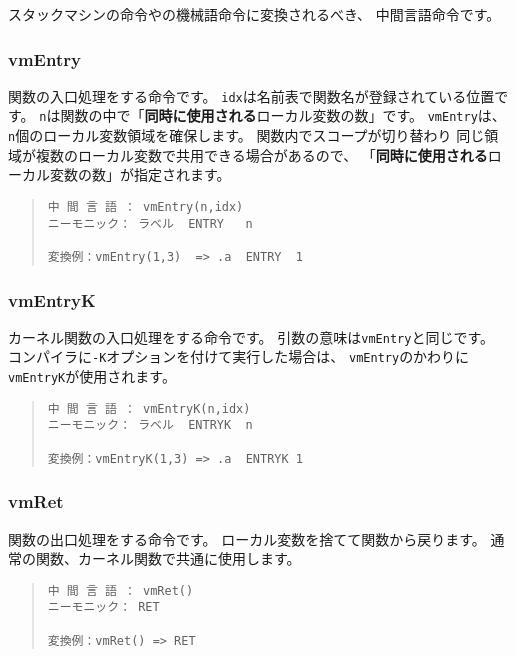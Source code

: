 スタックマシンの命令や\tac の機械語命令に変換されるべき、
中間言語命令です。

\subsubsection{vmEntry}

関数の入口処理をする命令です。
\verb/idx/は名前表で関数名が登録されている位置です。
\verb/n/は関数の中で「{\bf 同時に使用される}ローカル変数の数」です。
\verb/vmEntry/は、\verb/n/個のローカル変数領域を確保します。
関数内でスコープが切り替わり
同じ領域が複数のローカル変数で共用できる場合があるので、
「{\bf 同時に使用される}ローカル変数の数」が指定されます。

\begin{quote}
\begin{verbatim}
中 間 言 語 ： vmEntry(n,idx)
ニーモニック： ラベル  ENTRY   n

変換例：vmEntry(1,3)  => .a  ENTRY  1
\end{verbatim}
\end{quote}

\subsubsection{vmEntryK}

カーネル関数の入口処理をする命令です。
引数の意味は\verb/vmEntry/と同じです。
\cmm コンパイラに\verb/-K/オプションを付けて実行した場合は、
\verb/vmEntry/のかわりに\verb/vmEntryK/が使用されます。

\begin{quote}
\begin{verbatim}
中 間 言 語 ： vmEntryK(n,idx)
ニーモニック： ラベル  ENTRYK  n

変換例：vmEntryK(1,3) => .a  ENTRYK 1
\end{verbatim}
\end{quote}

\subsubsection{vmRet}

関数の出口処理をする命令です。
ローカル変数を捨てて関数から戻ります。
通常の関数、カーネル関数で共通に使用します。

\begin{quote}
\begin{verbatim}
中 間 言 語 ： vmRet()
ニーモニック： RET

変換例：vmRet() => RET
\end{verbatim}
\end{quote}



